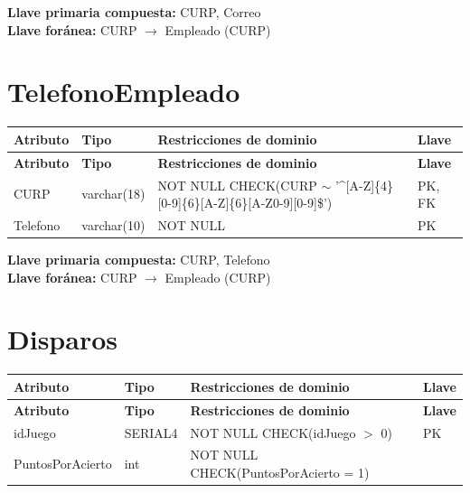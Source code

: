 \documentclass[12pt]{article}
\begin{document}
\vspace{2pt}
\textbf{Llave primaria compuesta:} CURP, Correo\\
\textbf{Llave foránea:} CURP $\rightarrow$ Empleado (CURP)\\


\section*{TelefonoEmpleado}

\begin{longtable}{p{3.5cm} p{2.5cm} p{7.5cm} p{1.5cm}}
\label{tab:telefonoempleado}\\
\toprule
\textbf{Atributo} & \textbf{Tipo} & \textbf{Restricciones de dominio} & \textbf{Llave} \\
\midrule
\endfirsthead

\toprule
\textbf{Atributo} & \textbf{Tipo} & \textbf{Restricciones de dominio} & \textbf{Llave} \\
\midrule
\endhead

\bottomrule
\endfoot

CURP 
& varchar(18) 
& NOT NULL \newline CHECK(CURP $\sim$ '\^{}[A-Z]\{4\}[0-9]\{6\}[A-Z]\{6\}[A-Z0-9][0-9]\$')
& PK, FK \\

Telefono 
& varchar(10) 
& NOT NULL
& PK \\

\end{longtable}

\vspace{2pt}
\textbf{Llave primaria compuesta:} CURP, Telefono\\
\textbf{Llave foránea:} CURP $\rightarrow$ Empleado (CURP)\\

\section*{Disparos}

\begin{longtable}{p{3.5cm} p{2.5cm} p{7.5cm} p{1.5cm}}
\label{tab:disparos}\\
\toprule
\textbf{Atributo} & \textbf{Tipo} & \textbf{Restricciones de dominio} & \textbf{Llave} \\
\midrule
\endfirsthead

\toprule
\textbf{Atributo} & \textbf{Tipo} & \textbf{Restricciones de dominio} & \textbf{Llave} \\
\midrule
\endhead

\bottomrule
\endfoot

idJuego 
& SERIAL4 
& NOT NULL \newline CHECK(idJuego $>$ 0)
& PK \\

PuntosPorAcierto 
& int
& NOT NULL \newline CHECK(PuntosPorAcierto = 1)
& \\

\end{longtable}
\end{document}

